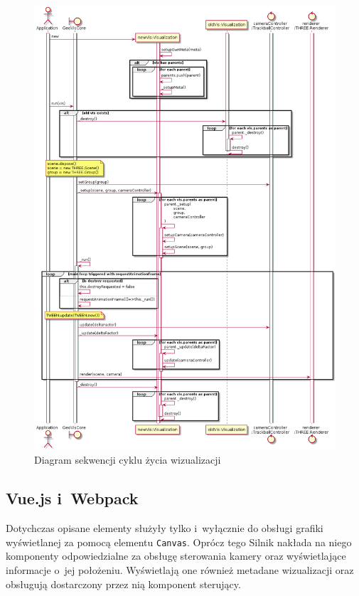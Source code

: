 \begin{figure}
    \centering
    \includegraphics[width=\textwidth]{diagrams/out/c3_lifecycle_seq.png}
    \caption{Diagram sekwencji cyklu życia wizualizacji}
    \label{fig:c3_lifecycle_seq}
\end{figure}

\subsection{Vue.js i~Webpack}

Dotychczas opisane elementy służyły tylko i~wyłącznie do obsługi grafiki wyświetlanej za pomocą elementu \texttt{Canvas}. Oprócz tego Silnik nakłada na niego komponenty odpowiedzialne za obsługę sterowania kamery oraz wyświetlające informacje o~jej położeniu. Wyświetlają one również metadane wizualizacji oraz obsługują dostarczony przez nią komponent sterujący. 

